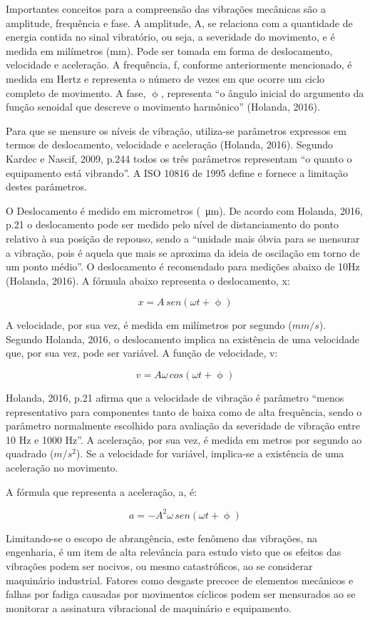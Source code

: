 \documentclass[
	12pt,				
	oneside,			
	a4paper,			
	english,			
	brazil				
	]{abntex2ppgsi}
\begin{document}
Importantes conceitos para a compreensão das vibrações mecânicas são a amplitude, frequência e fase. A amplitude, A, se relaciona com a quantidade de energia contida no sinal vibratório, ou seja, a severidade do movimento, e é medida em milímetros (mm). Pode ser tomada em forma de deslocamento, velocidade e aceleração.  A frequência, f, conforme anteriormente mencionado, é medida em Hertz e representa o número de vezes em que ocorre um ciclo completo de movimento. A fase, $\upphi$, representa “o ângulo inicial do argumento da função senoidal que descreve o movimento harmônico” (Holanda, 2016).
 
Para que se mensure os níveis de vibração, utiliza-se parâmetros expressos em termos de deslocamento, velocidade e aceleração (Holanda, 2016). Segundo Kardec e Nascif, 2009, p.244 todos os três parâmetros representam “o quanto o equipamento está vibrando”. A ISO 10816 de 1995 define e fornece a limitação destes parâmetros. 

O Deslocamento é medido em micrometros (\SI{}{\micro\metre}). De acordo com Holanda, 2016, p.21 o deslocamento pode ser medido pelo nível de distanciamento do ponto relativo à sua posição de repouso, sendo a “unidade mais óbvia para se mensurar a vibração, pois é aquela que mais se aproxima da ideia de oscilação em torno de um ponto médio”. O deslocamento é recomendado para medições abaixo de 10Hz (Holanda, 2016). A fórmula abaixo representa o deslocamento, x:

\[x = A \,sen (\omega t + \upphi)\]

A velocidade, por sua vez, é medida em milímetros por segundo ($mm/s$). Segundo Holanda, 2016, o deslocamento implica na existência de uma velocidade que, por sua vez, pode ser variável. A função de velocidade, v:

\[v = A\omega \,cos (\omega t + \upphi)\]

Holanda, 2016, p.21 afirma que a velocidade de vibração é parâmetro “menos representativo para componentes tanto de baixa como de alta frequência, sendo o parâmetro normalmente escolhido para avaliação da severidade de vibração entre 10 Hz e 1000 Hz”.
A aceleração, por sua vez, é medida em metros por segundo ao quadrado ($m/s^{2}$). Se a velocidade for variável, implica-se a existência de uma aceleração no movimento. 

A fórmula que representa a aceleração, a, é:

\[a = -A^{2} \omega \,sen (\omega t + \upphi)\]

Limitando-se o escopo de abrangência, este fenômeno das vibrações, na engenharia, é um item de alta relevância para estudo visto que os efeitos das vibrações podem ser nocivos, ou mesmo catastróficos, ao se considerar maquinário industrial. Fatores como desgaste precoce de elementos mecânicos e falhas por fadiga causadas por movimentos cíclicos podem ser mensurados ao se monitorar a assinatura vibracional de maquinário e equipamento. 
\end{document}
